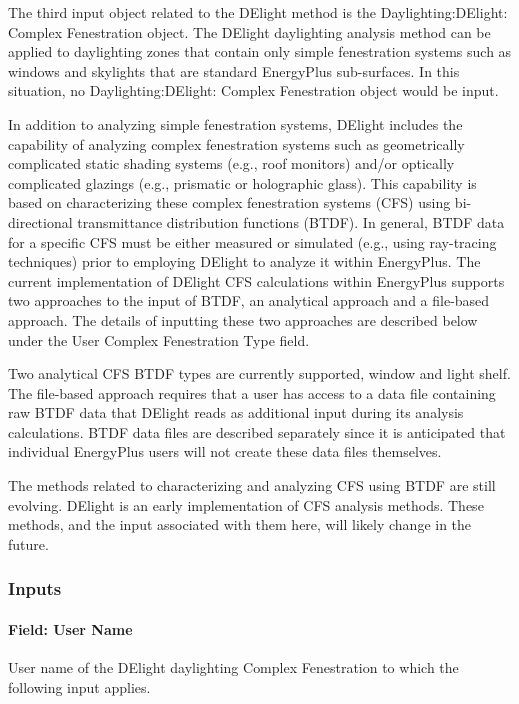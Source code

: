 The third input object related to the DElight method is the Daylighting:DElight: Complex Fenestration object. The DElight daylighting analysis method can be applied to daylighting zones that contain only simple fenestration systems such as windows and skylights that are standard EnergyPlus sub-surfaces. In this situation, no Daylighting:DElight: Complex Fenestration object would be input.

In addition to analyzing simple fenestration systems, DElight includes the capability of analyzing complex fenestration systems such as geometrically complicated static shading systems (e.g., roof monitors) and/or optically complicated glazings (e.g., prismatic or holographic glass). This capability is based on characterizing these complex fenestration systems (CFS) using bi-directional transmittance distribution functions (BTDF). In general, BTDF data for a specific CFS must be either measured or simulated (e.g., using ray-tracing techniques) prior to employing DElight to analyze it within EnergyPlus. The current implementation of DElight CFS calculations within EnergyPlus supports two approaches to the input of BTDF, an analytical approach and a file-based approach. The details of inputting these two approaches are described below under the User Complex Fenestration Type field.

Two analytical CFS BTDF types are currently supported, window and light shelf. The file-based approach requires that a user has access to a data file containing raw BTDF data that DElight reads as additional input during its analysis calculations. BTDF data files are described separately since it is anticipated that individual EnergyPlus users will not create these data files themselves.

The methods related to characterizing and analyzing CFS using BTDF are still evolving. DElight is an early implementation of CFS analysis methods. These methods, and the input associated with them here, will likely change in the future.

\subsubsection{Inputs}\label{inputs-3-007}

\paragraph{Field: User Name}\label{field-user-name}

User name of the DElight daylighting Complex Fenestration to which the following input applies.

